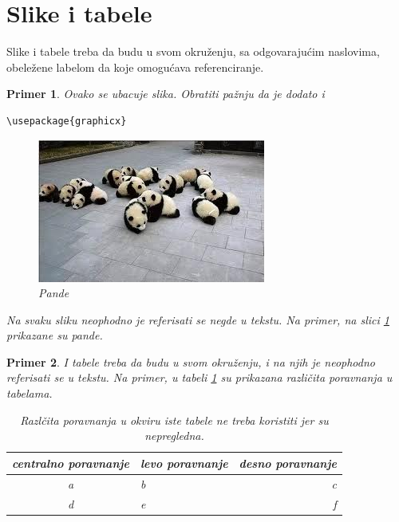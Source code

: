 \documentclass[a4paper]{article}
\newtheorem{primer}{Primer}[section]
\begin{document}
{\section{Slike i tabele}
\label{slike_i_tabele}

Slike i tabele treba da budu u svom okruženju, sa odgovarajućim naslovima, obeležene labelom da koje omogućava referenciranje. 

\begin{primer} Ovako se ubacuje slika. Obratiti pažnju da je dodato i 
\begin{verbatim}
\usepackage{graphicx}
\end{verbatim}

\begin{figure}[h!]
\begin{center}
\includegraphics[scale=0.75]{panda.jpg}
\end{center}
\caption{Pande}
\label{fig:pande}
\end{figure}

Na svaku sliku neophodno je referisati se negde u tekstu. Na primer, na slici \ref{fig:pande} prikazane su pande. 
\end{primer}

\begin{primer} I tabele treba da budu u svom okruženju, i na njih je neophodno referisati se u tekstu. Na primer, u tabeli \ref{tab:tabela1} su prikazana različita poravnanja u tabelama.

\begin{table}[h!]
\begin{center}
\caption{Razlčita poravnanja u okviru iste tabele ne treba koristiti jer su nepregledna.}
\begin{tabular}{|c|l|r|} \hline
centralno poravnanje& levo poravnanje& desno poravnanje\\ \hline
a &b&c\\ \hline
d &e&f\\ \hline
\end{tabular}
\label{tab:tabela1}
\end{center}
\end{table}


\end{primer}}
\end{document}
